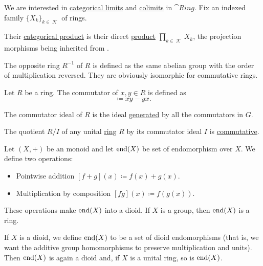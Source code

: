 \begin{proposition}\label{thm:ring_categorical_limits}
  We are interested in \hyperref[def:categorical_limit]{categorical limits} and \hyperref[def:categorical_colimit]{colimits} in \( \cat{Ring} \). Fix an indexed family  \( \{ X_k \}_{k \in \mscrK} \) of rings.
  \begin{thmenum}
     Their \hyperref[def:categorical_product]{categorical product} is their direct \hyperref[def:semiring_direct_product]{product} \( \prod_{k \in \mscrK} X_k \), the projection morphisms being inherited from .
  \end{thmenum}
\end{proposition}

\begin{definition}\label{def:opposite_ring}
  The opposite ring \( R^{-1} \) of \( R \) is defined as the same abelian group with the order of multiplication reversed. They are obviously isomorphic for commutative rings.
\end{definition}

\begin{definition}\label{def:ring_commutator}
  Let \( R \) be a ring. The commutator of \( x, y \in R \) is defined as
  \begin{equation*}
    [x, y] \coloneqq xy - yx.
  \end{equation*}

  The commutator ideal of \( R \) is the ideal \hyperref[def:generated_ring_ideal]{generated} by all the commutators in \( G \).
\end{definition}

\begin{proposition}\label{thm:quotient_by_commutator_ideal}
  The quotient \( R / I \) of any unital \hyperref[def:semiring/unital_ring]{ring} \( R \) by its commutator ideal \( I \) is \hyperref[def:semiring/commutative_ring]{commutative}.
\end{proposition}

\begin{definition}\label{def:endomorphism_dioid}
  Let \( (X, +) \) be an monoid and let \( \operatorname{end}(X) \) be set of endomorphism over \( X \). We define two operations:
  \begin{itemize}
    \item Pointwise addition \( [f + g](x) \coloneqq f(x) + g(x) \).
    \item Multiplication by composition \( [fg](x) \coloneqq f(g(x)) \).
  \end{itemize}

  These operations make \( \operatorname{end}(X) \) into a dioid. If \( X \) is a group, then \( \operatorname{end}(X) \) is a ring.

  If \( X \) is a dioid, we define \( \operatorname{end}(X) \) to be a set of dioid endomorphisms (that is, we want the additive group homomorphisms to preserve multiplication and units). Then \( \operatorname{end}(X) \) is again a dioid and, if \( X \) is a unital ring, so is \( \operatorname{end}(X) \).
\end{definition}

